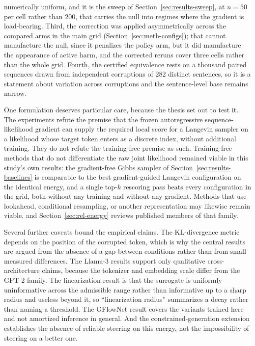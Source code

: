 numerically uniform, and it is the sweep of Section~\ref{sec:results-sweep}, at $n = 50$ per cell rather than $200$, that carries the null into regimes where the gradient is load-bearing. Third, the correction was applied asymmetrically across the compared arms in the main grid (Section~\ref{sec:meth-configs}); that cannot manufacture the null, since it penalizes the policy arm, but it did manufacture the appearance of active harm, and the corrected reruns cover three cells rather than the whole grid. Fourth, the certified equivalence rests on a thousand paired sequences drawn from independent corruptions of $282$ distinct sentences, so it is a statement about variation across corruptions and the sentence-level base remains narrow.

One formulation deserves particular care, because the thesis set out to test it. The experiments refute the premise that the frozen autoregressive sequence-likelihood gradient can supply the required local score for a Langevin sampler on a likelihood whose target token enters as a discrete index, without additional training. They do not refute the training-free premise as such. Training-free methods that do not differentiate the raw joint likelihood remained viable in this study's own results: the gradient-free Gibbs sampler of Section~\ref{sec:results-baselines} is comparable to the best gradient-guided Langevin configuration on the identical energy, and a single top-$k$ rescoring pass beats every configuration in the grid, both without any training and without any gradient. Methods that use lookahead, conditional resampling, or another representation may likewise remain viable, and Section~\ref{sec:rel-energy} reviews published members of that family.

Several further caveats bound the empirical claims. The KL-divergence metric depends on the position of the corrupted token, which is why the central results are argued from the absence of a gap between conditions rather than from small measured differences. The Llama-3 results support only qualitative cross-architecture claims, because the tokenizer and embedding scale differ from the GPT-2 family. The linearization result is that the surrogate is uniformly uninformative across the admissible range rather than informative up to a sharp radius and useless beyond it, so ``linearization radius'' summarizes a decay rather than naming a threshold. The GFlowNet result covers the variants trained here and not amortized inference in general. And the constrained-generation extension establishes the absence of reliable steering on this energy, not the impossibility of steering on a better one.

